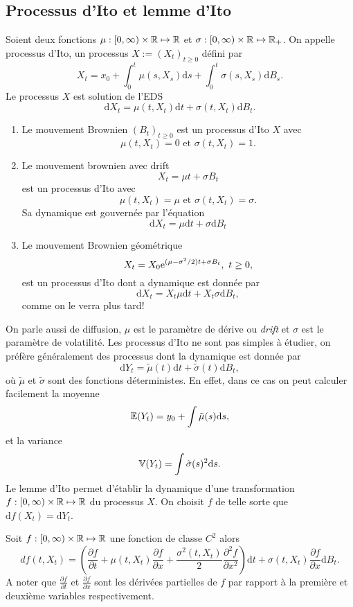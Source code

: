 \subsection{Processus d'Ito et lemme d'Ito}
\begin{definition}
Soient deux fonctions $\mu:[0,\infty)\times\mathbb{R}\mapsto \mathbb{R}$ et $\sigma:[0,\infty)\times\mathbb{R}\mapsto \mathbb{R}_+$. On appelle processus d'Ito, un processus $X:=(X_t)_{t\geq 0}$
 défini par 
 $$
 X_t = x_0 +  \int_0^t\mu(s,X_s)\text{d}s + \int_0^t\sigma(s,X_s)\text{d}B_s.
 $$
Le processus $X$ est solution de l'EDS
$$
\text{d}X_t = \mu(t,X_t)\text{d}t + \sigma(t,X_t)\text{d}B_t.
$$
\end{definition}
\begin{ex}
\begin{enumerate}
	\item Le mouvement Brownien $(B_t)_{t\geq 0}$ est un processus d'Ito $X$ avec 
	$$
	\mu(t,X_t) = 0\text{ et }\sigma(t,X_t) = 1.
	$$
	\item Le mouvement brownien avec drift 
	$$
	X_t = \mu t + \sigma B_t
	$$
	est un processus d'Ito avec 
	$$
	\mu(t,X_t) = \mu\text{ et }\sigma(t,X_t) = \sigma.
	$$
	Sa dynamique est gouvernée par l'équation
	$$
	\text{d}X_t = \mu\text{d}t+\sigma \text{d}B_t
	$$
	\item Le mouvement Brownien géométrique 
	$$
	X_t = X_0\mathrm{e}^{(\mu - \sigma^2/2)t + \sigma B_t},\text{ }t\geq 0,
	$$
	est un processus d'Ito dont a dynamique est donnée par 
	$$
	\text{d}X_t = X_t\mu\text{d}t+X_t\sigma\text{d}B_t,
	$$
	comme on le verra plus tard!
\end{enumerate}
\end{ex}
On parle aussi de diffusion, $\mu$ est le paramètre de dérive ou \textit{drift} et $\sigma$ est le paramètre de volatilité. Les processus d'Ito ne sont pas simples à étudier, on préfère généralement des processus dont la dynamique est donnée par
$$
\text{d}Y_t = \tilde{\mu}(t)\text{d}t+ \tilde{\sigma}(t)\text{d}B_t,
$$
où $\tilde{\mu}$ et $\tilde{\sigma}$ sont des fonctions déterministes. En effet, dans ce cas on peut calculer facilement la moyenne 
$$
\mathbb{E}(Y_t) = y_0 + \int\tilde{\mu}(s)\text{d}s,
$$
et la variance
$$
\mathbb{V}(Y_t) = \int\tilde{\sigma}(s)^2\text{d}s.
$$
Le lemme d'Ito permet d'établir la dynamique d'une transformation $f:[0,\infty)\times\mathbb{R}\mapsto \mathbb{R}$ du processus $X$. On choisit $f$ de telle sorte que $\text{d}f(X_t) = \text{d}Y_t$.
\begin{theo}
Soit $f:[0,\infty)\times\mathbb{R}\mapsto \mathbb{R}$ une fonction de classe $C^2$ alors 
$$
df(t,X_t) = \left(\frac{\partial f}{\partial t} + \mu(t,X_t)\frac{\partial f}{\partial x}+\frac{\sigma^2(t,X_t)}{2}\frac{\partial^2 f}{\partial x^2}\right)\text{d}t + \sigma(t,X_t)\frac{\partial f}{\partial x}\text{d}B_t.
$$
A noter que $\frac{\partial f}{\partial t}$ et $\frac{\partial f}{\partial x}$ sont les dérivées partielles de $f$ par rapport à la première et deuxième variables respectivement.
\end{theo}
